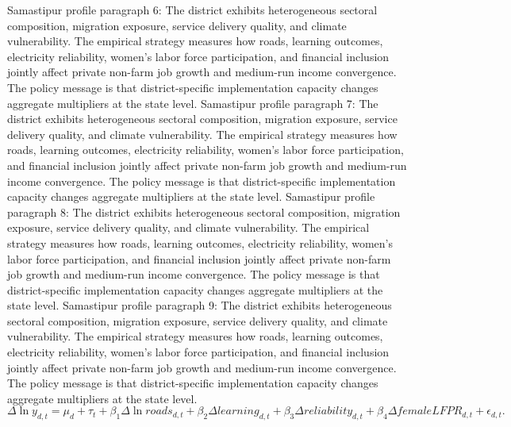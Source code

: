 \documentclass[preprint,12pt]{elsarticle}
\begin{document}
Samastipur profile paragraph 6: The district exhibits heterogeneous sectoral composition, migration exposure, service delivery quality, and climate vulnerability. The empirical strategy measures how roads, learning outcomes, electricity reliability, women's labor force participation, and financial inclusion jointly affect private non-farm job growth and medium-run income convergence. The policy message is that district-specific implementation capacity changes aggregate multipliers at the state level.
Samastipur profile paragraph 7: The district exhibits heterogeneous sectoral composition, migration exposure, service delivery quality, and climate vulnerability. The empirical strategy measures how roads, learning outcomes, electricity reliability, women's labor force participation, and financial inclusion jointly affect private non-farm job growth and medium-run income convergence. The policy message is that district-specific implementation capacity changes aggregate multipliers at the state level.
Samastipur profile paragraph 8: The district exhibits heterogeneous sectoral composition, migration exposure, service delivery quality, and climate vulnerability. The empirical strategy measures how roads, learning outcomes, electricity reliability, women's labor force participation, and financial inclusion jointly affect private non-farm job growth and medium-run income convergence. The policy message is that district-specific implementation capacity changes aggregate multipliers at the state level.
Samastipur profile paragraph 9: The district exhibits heterogeneous sectoral composition, migration exposure, service delivery quality, and climate vulnerability. The empirical strategy measures how roads, learning outcomes, electricity reliability, women's labor force participation, and financial inclusion jointly affect private non-farm job growth and medium-run income convergence. The policy message is that district-specific implementation capacity changes aggregate multipliers at the state level.
\begin{equation}\Delta \ln y_{d,t}=\mu_d+\tau_t+\beta_1\Delta\ln roads_{d,t}+\beta_2\Delta learning_{d,t}+\beta_3\Delta reliability_{d,t}+\beta_4\Delta femaleLFPR_{d,t}+\epsilon_{d,t}.\end{equation}
\end{document}
